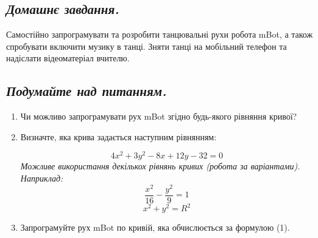 \documentclass[12pt, a4paper]{article}
\begin{document}
\subsection*{\textit{Домашнє завдання.}}
Самостійно запрограмувати та розробити танцювальні рухи робота mBot, а також спробувати включити музику в танці. Зняти танці на мобільний телефон та надіслати відеоматеріал вчителю.

	
\subsection*{\textit{Подумайте над питанням.}}
\begin{enumerate}
\item Чи можливо запрограмувати рух mBot згідно будь-якого рівняння кривої?
\item Визначте, яка крива задається наступним рівнянням:

\begin{equation}
	4x^2+3y^2-8x+12y-32=0
\end{equation}
\textit{Можливе використання декількох рівнянь кривих (робота за варіантами). Наприклад:}
\begin{equation}
\frac{x^2}{16}-\frac{y^2}{9}=1
\end{equation}
\begin{equation}
	x^2+y^2=R^2
\end{equation}

\item Запрограмуйте рух mBot по кривій, яка обчислюється за формулою (1).

\end{enumerate}
	
\end{document}
